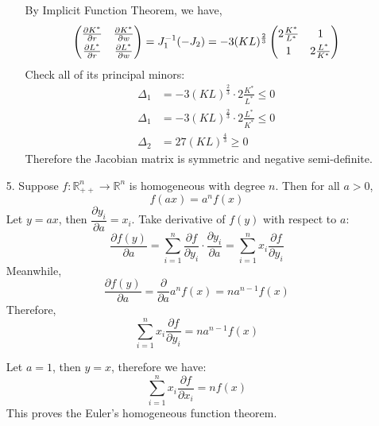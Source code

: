\documentclass{article}
\begin{document}
\begin{enumerate}
\begin{enumerate}
            By Implicit Function Theorem, we have,
            \[
                \def\arraystretch{1.3}
                \begin{pmatrix}
                    \frac{\partial K^*}{\partial r} & \frac{\partial K^*}{\partial w} \\
                    \frac{\partial L^*}{\partial r} & \frac{\partial L^*}{\partial w} \\
                \end{pmatrix}  = J_1^{-1}(-J_2) 
                 = -3(KL)^{\frac{2}{3}} 
                \begin{pmatrix}
                    2\frac{K^*}{L^*} & 1 \\
                    1 & 2\frac{L^*}{K^*} \\ 
                \end{pmatrix}
            \]
            Check all of its principal minors: 
            \begin{align*}
                \Delta_1 &= -3(KL)^{\frac{2}{3}} \cdot 2\frac{K^*}{L^*} \leq 0 \\
                \Delta_1 &= -3(KL)^{\frac{2}{3}} \cdot 2\frac{L^*}{K^*} \leq 0 \\
                \Delta_2 &= 27(KL)^{\frac{4}{3}} \geq 0 
            \end{align*}
            Therefore the Jacobian matrix is symmetric and negative semi-definite.\\
            
        \end{enumerate}
        
        
        \item[5. ] Suppose $f: \mathbb{R}^n_{++} \to \mathbb{R}^n$ is homogeneous with degree $n$. 
        Then for all $a>0$, 
        $$ f(ax) = a^n f(x) $$
        Let $y = ax$, then $\dfrac{\partial y_i}{\partial a} = x_i$. 
        Take derivative of $f(y)$ with respect to $a$:
        $$ \frac{\partial f(y)}{\partial a} = \sum_{i=1}^{n} \frac{\partial f}{\partial y_i} \cdot
            \frac{\partial y_i}{\partial a} = \sum_{i=1}^{n} x_i \frac{\partial f}{\partial y_i}
        $$
        Meanwhile, 
        $$ \frac{\partial f(y)}{\partial a} = \frac{\partial}{\partial a} a^n f(x) = na^{n-1}f(x) $$
        Therefore,
        $$ \sum_{i=1}^{n} x_i \frac{\partial f}{\partial y_i} = na^{n-1}f(x) $$
        
        Let $a=1$, then $y=x$, therefore we have:
        $$ \sum_{i=1}^{n} x_i \frac{\partial f}{\partial x_i} = nf(x) $$
        This proves the Euler’s homogeneous function theorem.\\
        

\end{enumerate}
\end{document}
